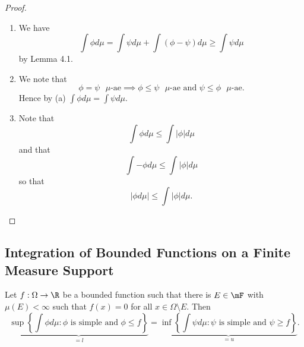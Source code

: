\documentclass[stat901]{subfiles}
\begin{document}
    \begin{proof}
        \begin{enumerate}
            \item We have
                \begin{equation*}
                    \int\phi d\mu = \int\psi d\mu + \int\left( \phi-\psi \right) d\mu \geq \int\psi d\mu
                \end{equation*}
                by Lemma 4.1.

            \item We note that 
                \begin{equation*}
                    \phi=\psi\text{ $\mu$-ae} \implies \phi\leq\psi\text{ $\mu$-ae and }\psi\leq\phi\text{ $\mu$-ae}.
                \end{equation*}
                Hence by (a) $\int\phi d\mu = \int\psi d\mu$.

            \item Note that
                \begin{equation*}
                    \int\phi d\mu \leq \int \left| \phi \right|d\mu
                \end{equation*}
                and that
                \begin{equation*}
                    \int-\phi d\mu \leq \int \left| \phi \right|d\mu
                \end{equation*}
                so that
                \begin{equation*}
                    \left| \phi d\mu \right| \leq \int\left| \phi \right|d\mu.
                \end{equation*}
        \end{enumerate}
    \end{proof}

    \subsection{Integration of Bounded Functions on a Finite Measure Support}
    
    \begin{prop}{}
        Let $f:\Omega\to\R$ be a bounded function such that there is $E\in\mF$ with $\mu\left( E \right) < \infty$ such that $f\left( x \right)=0$ for all $x\in\Omega\setminus E$. Then
        \begin{equation*}
            \underbrace{\sup \left\lbrace \int\phi d\mu : \text{$\phi$ is simple and }\phi\leq f \right\rbrace}_{=l} = \underbrace{\inf \left\lbrace \int\psi d\mu : \text{$\psi$ is simple and }\psi\geq f \right\rbrace}_{=u}.
        \end{equation*}
    \end{prop}
\end{document}
